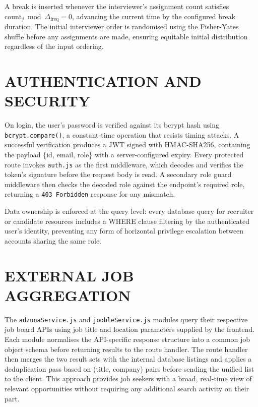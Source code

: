 \documentclass[12pt,a4paper]{report}
\begin{document}
A break is inserted whenever the interviewer's assignment count satisfies $\text{count}_j \bmod \Delta_{\text{freq}} = 0$, advancing the current time by the configured break duration. The initial interviewer order is randomised using the Fisher-Yates shuffle before any assignments are made, ensuring equitable initial distribution regardless of the input ordering.

\section{AUTHENTICATION AND SECURITY}

On login, the user's password is verified against its bcrypt hash using \texttt{bcrypt.compare()}, a constant-time operation that resists timing attacks. A successful verification produces a JWT signed with HMAC-SHA256, containing the payload \{id, email, role\} with a server-configured expiry. Every protected route invokes \texttt{auth.js} as the first middleware, which decodes and verifies the token's signature before the request body is read. A secondary role guard middleware then checks the decoded role against the endpoint's required role, returning a \texttt{403 Forbidden} response for any mismatch.

Data ownership is enforced at the query level: every database query for recruiter or candidate resources includes a WHERE clause filtering by the authenticated user's identity, preventing any form of horizontal privilege escalation between accounts sharing the same role.

\section{EXTERNAL JOB AGGREGATION}

The \texttt{adzunaService.js} and \texttt{joobleService.js} modules query their respective job board APIs using job title and location parameters supplied by the frontend. Each module normalises the API-specific response structure into a common job object schema before returning results to the route handler. The route handler then merges the two result sets with the internal database listings and applies a deduplication pass based on (title, company) pairs before sending the unified list to the client. This approach provides job seekers with a broad, real-time view of relevant opportunities without requiring any additional search activity on their part.

\end{document}
